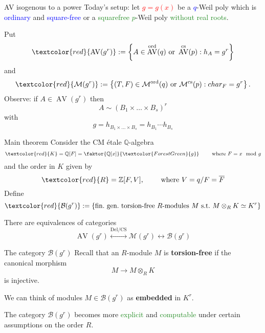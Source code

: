 \documentclass[usenames,dvipsnames]{beamer}
\def\Q{\mathbb{Q}}
\def\Z{\mathbb{Z}}
\DeclareMathOperator{\AV}{AV}
\renewcommand{\char}{char}
\newcommand{\cB}{{\mathcal B}}
\newcommand{\cM}{{\mathcal M}}
\newcommand{\set}[1]{\left\lbrace#1\right\rbrace }
\newcommand{\AVord}[1]{\AV^{\text{ord}}({#1})}
\newcommand{\Modord}[1]{\cM^{\text{ord}}({#1})}
\newcommand{\AVcs}[1]{\AV^{\text{cs}}({#1})}
\newcommand{\Modcs}[1]{\cM^{\text{cs}}({#1})}
\newcommand{\red}[1]{\textcolor{red}{#1}}
\newcommand{\blue}[1]{\textcolor{blue}{#1}}
\newcommand{\green}[1]{\textcolor{ForestGreen}{#1}}
\begin{document}
\begin{frame}{AV isogenous to a power }
Today's setup:
\pause
let \red{$g=g(x)$} be a \blue{$q$}-Weil poly which is \blue{ordinary} and \blue{square-free} or a \green{squarefree $p$}-Weil poly \green{without real roots}.

\pause Put 
\[\red{\AV(g^r)}:=\set{ A \in \AVord{q} \text{ or }\AVcs{p} : h_A = g^r }\]
\pause
and
\[\red{\cM(g^r)}:=\set{ (T,F) \in \Modord{q}\text{ or }\Modcs{p} : \char_F = g^r }.\]
\pause
Observe: if $A\in \AV(g^r)$ then
\[ A \sim (B_1\times \ldots \times B_s)^r \]
with
\[ g=h_{B_1\times \ldots \times B_s}=h_{B_1}\cdots h_{B_s} \]
\end{frame}

\begin{frame}{Main theorem}
Consider the CM \'etale $\Q$-algebra
\[ \red{K} = \Q[F] = \faktor{\Q[x]}{\green{g}} \qquad \text{ where }F=x \mod g \]
\pause and the order in $K$ given by
\[ \red{R} = \Z[F,V], \qquad \text{ where }V=q/F=\overline{F}\]
\pause Define
\[\red{\cB(g^r)}:=\set{ \text{fin.~gen.~torsion-free $R$-modules $M$ s.t.~$M\otimes_R K\simeq K^r$} } \]
\pause
\begin{theorem}[M.]
 There are equivalences of categories
 \[ \AV(g^r) \overset{\text{Del/CS}}{\longleftrightarrow} \cM(g^r) \longleftrightarrow \cB(g^r) \]
\end{theorem}
\end{frame}

\begin{frame}{ The category $\cB(g^r)$ }
Recall that an $R$-module $M$ is \textbf{torsion-free} if the canonical morphism
\[ M \to M\otimes_R K \]
is injective.

\pause We can think of modules $M\in \cB(g^r)$ as \textbf{embedded} in $K^r$.

\pause The category $\cB(g^r)$ becomes more \green{explicit} and \green{computable} under certain assumptions on the order $R$.
\end{frame}
\end{document}
